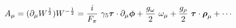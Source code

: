 \begin{equation}
A_\mu =(\partial_\mu W^{\frac{1}{2}}) W^{-\frac{1}{2}} = \frac{i}{F_\pi}~\gamma_5 \mbox{\boldmath$\tau$} \cdot \partial_\mu \mbox{\boldmath$\phi$} + \frac{g_\omega}{2}~\omega_\mu + \frac{g_\rho}{2}~\mbox{\boldmath$\tau$} \cdot \mbox{\boldmath$\rho$}_\mu +\cdots
\end{equation}

